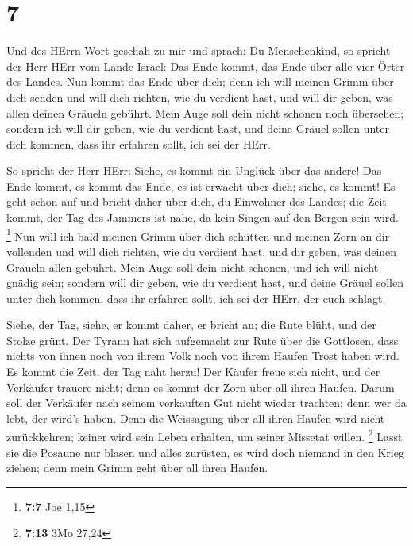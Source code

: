 \hypertarget{section-6}{%
\section{7}\label{section-6}}

 Und des HErrn Wort geschah zu mir und sprach:
 Du Menschenkind, so spricht der Herr HErr vom Lande
Israel: Das Ende kommt, das Ende über alle vier Örter des Landes.
 Nun kommt das Ende über dich; denn ich will meinen Grimm
über dich senden und will dich richten, wie du verdient hast, und will
dir geben, was allen deinen Gräueln gebührt.  Mein Auge
soll dein nicht schonen noch übersehen; sondern ich will dir geben, wie
du verdient hast, und deine Gräuel sollen unter dich kommen, dass ihr
erfahren sollt, ich sei der HErr.

 So spricht der Herr HErr: Siehe, es kommt ein Unglück
über das andere!  Das Ende kommt, es kommt das Ende, es
ist erwacht über dich; siehe, es kommt!  Es geht schon auf
und bricht daher über dich, du Einwohner des Landes; die Zeit kommt, der
Tag des Jammers ist nahe, da kein Singen auf den Bergen sein wird.
\footnote{\textbf{7:7} Joe 1,15}  Nun will ich bald meinen
Grimm über dich schütten und meinen Zorn an dir vollenden und will dich
richten, wie du verdient hast, und dir geben, was deinen Gräueln allen
gebührt.  Mein Auge soll dein nicht schonen, und ich will
nicht gnädig sein; sondern will dir geben, wie du verdient hast, und
deine Gräuel sollen unter dich kommen, dass ihr erfahren sollt, ich sei
der HErr, der euch schlägt.

 Siehe, der Tag, siehe, er kommt daher, er bricht an; die
Rute blüht, und der Stolze grünt.  Der Tyrann hat sich
aufgemacht zur Rute über die Gottlosen, dass nichts von ihnen noch von
ihrem Volk noch von ihrem Haufen Trost haben wird.  Es
kommt die Zeit, der Tag naht herzu! Der Käufer freue sich nicht, und der
Verkäufer trauere nicht; denn es kommt der Zorn über all ihren Haufen.
 Darum soll der Verkäufer nach seinem verkauften Gut
nicht wieder trachten; denn wer da lebt, der wird's haben. Denn die
Weissagung über all ihren Haufen wird nicht zurückkehren; keiner wird
sein Leben erhalten, um seiner Missetat willen. \footnote{\textbf{7:13}
  3Mo 27,24}  Lasst sie die Posaune nur blasen und alles
zurüsten, es wird doch niemand in den Krieg ziehen; denn mein Grimm geht
über all ihren Haufen.

